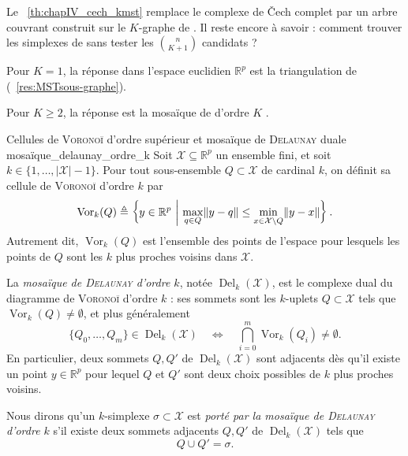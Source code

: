 Le \Th~\ref{th:chapIV_cech_kmst} remplace le complexe de \v Cech complet par un arbre couvrant construit sur le $K$-graphe de . Il reste encore à savoir : comment trouver les simplexes de  sans tester les $\binom n{K+1}$ candidats ?

Pour $K=1$, la réponse dans l'espace euclidien $\mathbb R^p$ est la triangulation de  (\Res~\ref{res:MSTsous-graphe}). 

Pour $K\ge2$, la réponse est la mosaïque de  d'ordre $K$ \cite{edelsbrunnerOsang2021multicover, osangEdelsbrunner2023algorithm}.



\begin{Definition}{Cellules de \textsc{Voronoï} d'ordre supérieur et mosaïque de \textsc{Delaunay} duale \cite{edelsbrunnerOsang2021multicover, osangEdelsbrunner2023algorithm}}{mosaïque_delaunay_ordre_k}
Soit $\mathcal X \subseteq \mathbb R^p$ un ensemble fini, et soit $k \in \{1,\ldots,|\mathcal X|-1\}$.
Pour tout sous-ensemble $Q \subset \mathcal X$ de cardinal $k$, on définit sa cellule de \textsc{Voronoï} d'ordre $k$ par
\[
    \operatorname{Vor}_k(Q)
    \triangleq
    \left\{
        y \in \mathbb R^p
        \ \middle|\
        \max_{q\in Q} \lVert y-q \rVert
        \le
        \min_{x\in \mathcal X\setminus Q} \lVert y-x \rVert
    \right\}.
\]
Autrement dit, $\operatorname{Vor}_k(Q)$ est l'ensemble des points de l'espace pour lesquels les points de $Q$ sont les $k$ plus proches voisins dans $\mathcal X$.

La \emph{mosaïque de \textsc{Delaunay} d'ordre $k$}, notée $\operatorname{Del}_k(\mathcal X)$, est le complexe dual du diagramme de \textsc{Voronoï} d'ordre $k$ : ses sommets sont les $k$-uplets $Q \subset \mathcal X$ tels que $\operatorname{Vor}_k(Q)\neq\emptyset$, et plus généralement
\[
    \{Q_0,\ldots,Q_m\} \in \operatorname{Del}_k(\mathcal X)
    \quad\Longleftrightarrow\quad
    \bigcap_{i=0}^m \operatorname{Vor}_k(Q_i) \neq \emptyset.
\]
En particulier, deux sommets $Q,Q'$ de $\operatorname{Del}_k(\mathcal X)$ sont adjacents dès qu'il existe un point $y\in\mathbb R^p$ pour lequel $Q$ et $Q'$ sont deux choix possibles de $k$ plus proches voisins.

Nous dirons qu'un $k$-simplexe $\sigma\subset\mathcal X$ est \emph{porté par la mosaïque de \textsc{Delaunay} d'ordre $k$} s'il existe deux sommets adjacents $Q,Q'$ de $\operatorname{Del}_k(\mathcal X)$ tels que
\[
    Q\cup Q'=\sigma.
\]
\end{Definition}

